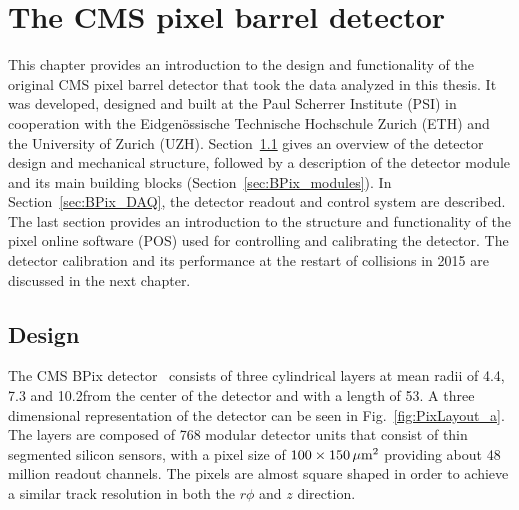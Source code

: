 \chapter{The CMS pixel barrel detector}
\label{ch:BPix}

This chapter provides an introduction to the design and functionality of the original CMS pixel barrel detector that took the data analyzed in this thesis.
It was developed, designed and built at the Paul Scherrer Institute (PSI) in cooperation with the Eidgen{\"o}ssische Technische Hochschule Zurich (ETH) and the University of Zurich (UZH).
Section~\ref{sec:BPix_design} gives an overview of the detector design and mechanical structure, followed by a description of the detector module and its main building blocks (Section~\ref{sec:BPix_modules}).
In Section~\ref{sec:BPix_DAQ}, the detector readout and control system are described.
The last section provides an introduction to the structure and functionality of the pixel online software (POS) used for controlling and calibrating the detector.
The detector calibration and its performance at the restart of collisions in 2015 are discussed in the next chapter.

\section{Design}\label{sec:BPix_design}

The CMS BPix detector~\cite{Kastli2007724} consists of three cylindrical layers at mean radii of 4.4, 7.3 and 10.2\cm from the center of the detector and with a length of 53\cm.
A three dimensional representation of the detector can be seen in Fig.~\ref{fig:PixLayout_a}.
The layers are composed of 768 modular detector units that consist of thin segmented silicon sensors, with a pixel size of $100\times150\,\mu\text{m}^2$ providing about 48 million readout channels.
The pixels are almost square shaped in order to achieve a similar track resolution in both the $r\phi$ and $z$ direction.

